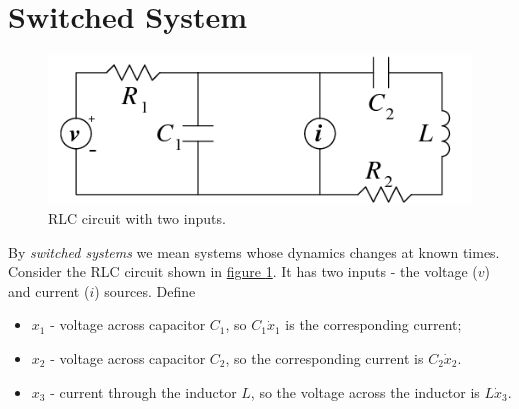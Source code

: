 \documentclass[letterpaper,10pt,english]{sphinxmanual}
\begin{document}
\section{Switched System}
\label{chap_examples:switched-system}\begin{figure}[htbp]
\centering
\capstart

\includegraphics{rlc.png}
\caption{RLC circuit with two inputs.}\label{chap_examples:rlcfig}\end{figure}

By \emph{switched systems} we mean systems whose dynamics changes at known
times. Consider the RLC circuit shown in \hyperref[chap_examples:rlcfig]{figure  \ref*{chap_examples:rlcfig}}. It has two
inputs - the voltage ($v$) and current ($i$) sources. Define
\begin{itemize}
\item {} 
$x_1$ - voltage across capacitor $C_1$, so
$C_1\dot{x}_1$ is the corresponding current;

\item {} 
$x_2$ - voltage across capacitor $C_2$, so the
corresponding current is $C_2\dot{x}_2$.

\item {} 
$x_3$ - current through the inductor $L$, so the voltage
across the inductor is $L\dot{x}_3$.

\end{itemize}
\end{document}

